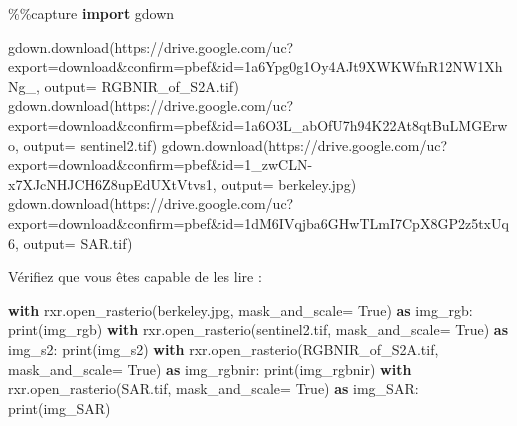 \documentclass[
]{article}
\newenvironment{Shaded}{}{}
\newcommand{\BuiltInTok}[1]{\textcolor[rgb]{0.00,0.50,0.00}{#1}}
\newcommand{\ControlFlowTok}[1]{\textcolor[rgb]{0.00,0.44,0.13}{\textbf{#1}}}
\newcommand{\ImportTok}[1]{\textcolor[rgb]{0.00,0.50,0.00}{\textbf{#1}}}
\newcommand{\NormalTok}[1]{#1}
\newcommand{\OperatorTok}[1]{\textcolor[rgb]{0.40,0.40,0.40}{#1}}
\newcommand{\StringTok}[1]{\textcolor[rgb]{0.25,0.44,0.63}{#1}}
\newcommand{\VariableTok}[1]{\textcolor[rgb]{0.10,0.09,0.49}{#1}}
\begin{document}
\label{1bb418e8}
\label{cb4}
\begin{Shaded}
\begin{Highlighting}[]
\OperatorTok{\%\%}\NormalTok{capture}
\ImportTok{import}\NormalTok{ gdown}

\NormalTok{gdown.download(}\StringTok{\textquotesingle{}https://drive.google.com/uc?export=download\&confirm=pbef\&id=1a6Ypg0g1Oy4AJt9XWKWfnR12NW1XhNg\_\textquotesingle{}}\NormalTok{, output}\OperatorTok{=} \StringTok{\textquotesingle{}RGBNIR\_of\_S2A.tif\textquotesingle{}}\NormalTok{)}
\NormalTok{gdown.download(}\StringTok{\textquotesingle{}https://drive.google.com/uc?export=download\&confirm=pbef\&id=1a6O3L\_abOfU7h94K22At8qtBuLMGErwo\textquotesingle{}}\NormalTok{, output}\OperatorTok{=} \StringTok{\textquotesingle{}sentinel2.tif\textquotesingle{}}\NormalTok{)}
\NormalTok{gdown.download(}\StringTok{\textquotesingle{}https://drive.google.com/uc?export=download\&confirm=pbef\&id=1\_zwCLN{-}x7XJcNHJCH6Z8upEdUXtVtvs1\textquotesingle{}}\NormalTok{, output}\OperatorTok{=} \StringTok{\textquotesingle{}berkeley.jpg\textquotesingle{}}\NormalTok{)}
\NormalTok{gdown.download(}\StringTok{\textquotesingle{}https://drive.google.com/uc?export=download\&confirm=pbef\&id=1dM6IVqjba6GHwTLmI7CpX8GP2z5txUq6\textquotesingle{}}\NormalTok{, output}\OperatorTok{=} \StringTok{\textquotesingle{}SAR.tif\textquotesingle{}}\NormalTok{)}
\end{Highlighting}
\end{Shaded}

Vérifiez que vous êtes capable de les lire :

\label{3e6f47b6}
\label{cb5}
\begin{Shaded}
\begin{Highlighting}[]
\ControlFlowTok{with}\NormalTok{ rxr.open\_rasterio(}\StringTok{\textquotesingle{}berkeley.jpg\textquotesingle{}}\NormalTok{, mask\_and\_scale}\OperatorTok{=} \VariableTok{True}\NormalTok{) }\ImportTok{as}\NormalTok{ img\_rgb:}
    \BuiltInTok{print}\NormalTok{(img\_rgb)}
\ControlFlowTok{with}\NormalTok{ rxr.open\_rasterio(}\StringTok{\textquotesingle{}sentinel2.tif\textquotesingle{}}\NormalTok{, mask\_and\_scale}\OperatorTok{=} \VariableTok{True}\NormalTok{) }\ImportTok{as}\NormalTok{ img\_s2:}
    \BuiltInTok{print}\NormalTok{(img\_s2)}
\ControlFlowTok{with}\NormalTok{ rxr.open\_rasterio(}\StringTok{\textquotesingle{}RGBNIR\_of\_S2A.tif\textquotesingle{}}\NormalTok{, mask\_and\_scale}\OperatorTok{=} \VariableTok{True}\NormalTok{) }\ImportTok{as}\NormalTok{ img\_rgbnir:}
    \BuiltInTok{print}\NormalTok{(img\_rgbnir)}
\ControlFlowTok{with}\NormalTok{ rxr.open\_rasterio(}\StringTok{\textquotesingle{}SAR.tif\textquotesingle{}}\NormalTok{, mask\_and\_scale}\OperatorTok{=} \VariableTok{True}\NormalTok{) }\ImportTok{as}\NormalTok{ img\_SAR:}
    \BuiltInTok{print}\NormalTok{(img\_SAR)}
\end{Highlighting}
\end{Shaded}
\end{document}
